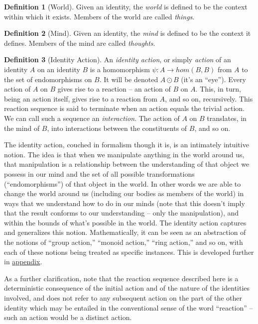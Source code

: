 \documentclass[pra,twocolumn,groupedaddress,10pt]{revtex4}
\theoremstyle{definition}
\newtheorem{defn}{Definition}[section]
\begin{document}
\begin{defn}[World]
	Given an identity, the \emph{world} is defined to be the context within which it exists. Members of the world are called \emph{things}.
\end{defn}

\begin{defn}[Mind]
	Given an identity, the \emph{mind} is defined to be the context it defines. Members of the mind are called \emph{thoughts}.
\end{defn}

\begin{defn}[Identity Action]
	An \emph{identity action}, or simply \emph{action} of an identity $A$ on an identity $B$ is a homomorphism $\psi : A \rightarrow hom(B,B)$ from $A$ to the set of endomorphisms on $B$. It will be denoted $A \odot B$ (it's an ``eye''). Every action of $A$ on $B$ gives rise to a reaction -- an action of $B$ on $A$. This, in turn, being an action itself, gives rise to a reaction from $A$, and so on, recursively. This reaction sequence is said to terminate when an action equals the trivial action. We can call such a sequence an \emph{interaction}. The action of $A$ on $B$ translates, in the mind of $B$, into interactions between the constituents of $B$, and so on.
\end{defn}

The identity action, couched in formalism though it is, is an intimately intuitive notion. The idea is that when we manipulate anything in the world around us, that manipulation is a relationship between the understanding of that object we possess in our mind and the set of all possible transformations (``endomorphisms'') of that object in the world. In other words we are able to change the world around us (including our bodies as members of the world) in ways that we understand how to do in our minds (note that this doesn't imply that the result conforms to our understanding -- only the manipulation), and within the bounds of what's possible in the world. The identity action captures and generalizes this notion. Mathematically, it can be seen as an abstraction of the notions of ``group action,'' ``monoid action,'' ``ring action,'' and so on, with each of these notions being treated as specific instances. This is developed further in \hyperref[app:algact]{appendix}.

As a further clarification, note that the reaction sequence described here is a deterministic consequence of the initial action and of the nature of the identities involved, and does not refer to any subsequent action on the part of the other identity which may be entailed in the conventional sense of the word ``reaction'' -- such an action would be a distinct action.
\end{document}
